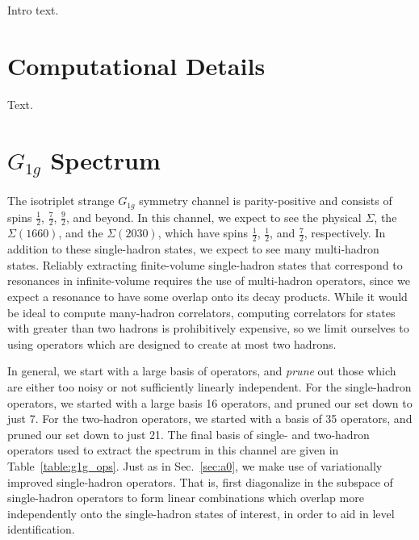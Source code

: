 Intro text.
\section{Computational Details}
Text.
\section{$G_{1g}$ Spectrum}
The isotriplet strange $G_{1g}$ symmetry channel is parity-positive and consists of spins $\frac{1}{2}$, $\frac{7}{2}$, $\frac{9}{2}$, and beyond. In this channel, we expect to see the physical $\Sigma$, the $\Sigma(1660)$, and the $\Sigma(2030)$, which have spins $\frac{1}{2}$, $\frac{1}{2}$, and $\frac{7}{2}$, respectively. In addition to these single-hadron states, we expect to see many multi-hadron states. Reliably extracting finite-volume single-hadron states that correspond to resonances in infinite-volume requires the use of multi-hadron operators, since we expect a resonance to have some overlap onto its decay products. While it would be ideal to compute many-hadron correlators, computing correlators for states with greater than two hadrons is prohibitively expensive, so we limit ourselves to using operators which are designed to create at most two hadrons.

In general, we start with a large basis of operators, and \emph{prune} out those which are either too noisy or not sufficiently linearly independent. For the single-hadron operators, we started with a large basis 16 operators, and pruned our set down to just 7. For the two-hadron operators, we started with a basis of 35 operators, and pruned our set down to just 21. The final basis of single- and two-hadron operators used to extract the spectrum in this channel are given in Table~\ref{table:g1g_ops}. Just as in Sec.~\ref{sec:a0}, we make use of variationally improved single-hadron operators. That is, first diagonalize in the subspace of single-hadron operators to form linear combinations which overlap more independently onto the single-hadron states of interest, in order to aid in level identification.

